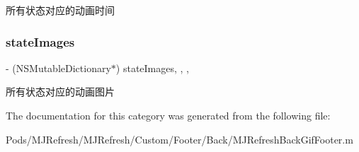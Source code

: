 所有状态对应的动画时间 \mbox{\label{category_m_j_refresh_back_gif_footer_07_08_a0446f85ecbe3680e9d3be3be84157881}} 
\subsubsection{\texorpdfstring{state\+Images}{stateImages}}
{\footnotesize\ttfamily -\/ (N\+S\+Mutable\+Dictionary$\ast$) state\+Images\hspace{0.3cm}{\ttfamily [read]}, {\ttfamily [write]}, {\ttfamily [nonatomic]}, {\ttfamily [strong]}}

所有状态对应的动画图片 

The documentation for this category was generated from the following file\+:\begin{DoxyCompactItemize}
\item 
Pods/\+M\+J\+Refresh/\+M\+J\+Refresh/\+Custom/\+Footer/\+Back/M\+J\+Refresh\+Back\+Gif\+Footer.\+m\end{DoxyCompactItemize}

